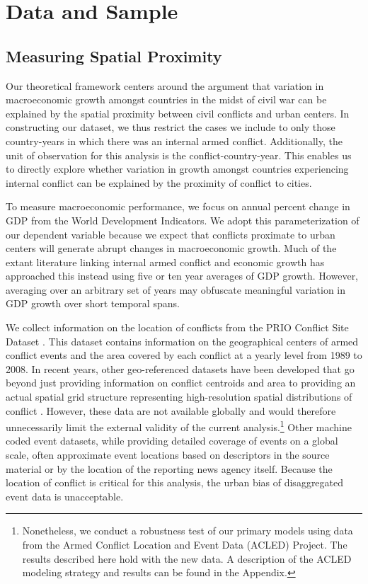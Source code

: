 
\section{Data and Sample}
\label{empirics}

\subsection{Measuring Spatial Proximity}

Our theoretical framework centers around the argument that variation in macroeconomic growth amongst countries in the midst of civil war can be explained by the spatial proximity between civil conflicts and urban centers. In constructing our dataset, we thus restrict the cases we include to only those country-years in which there was an internal armed conflict. Additionally, the unit of observation for this analysis is the conflict-country-year. This enables us to directly explore whether variation in growth amongst countries experiencing internal conflict can be explained by the proximity of conflict to cities.

To measure macroeconomic performance, we focus on annual percent change in GDP from the World Development Indicators. We adopt this parameterization of our dependent variable because we expect that conflicts proximate to urban centers will generate abrupt changes in macroeconomic growth. Much of the extant literature linking internal armed conflict and economic growth has approached this instead using five or ten year averages of GDP growth. However, averaging over an arbitrary set of years may obfuscate meaningful variation in GDP growth over short temporal spans.

We collect information on the location of conflicts from the PRIO Conflict Site Dataset \citep{hallberg:2012}. This dataset contains information on the geographical centers of armed conflict events and the area covered by each conflict at a yearly level from 1989 to 2008. In recent years, other geo-referenced datasets have been developed that go beyond just providing information on conflict centroids and area to providing an actual spatial grid structure representing high-resolution spatial distributions of conflict \citep{tollefsen:etal:2012}. However, these data are not available globally and would therefore unnecessarily limit the external validity of the current analysis.\footnote{Nonetheless, we conduct a robustness test of our primary models using data from the Armed Conflict Location and Event Data (ACLED) Project. The results described here hold with the new data. A description of the ACLED modeling strategy and results can be found in the Appendix.} Other machine coded event datasets, while providing detailed coverage of events on a global scale, often approximate event locations based on descriptors in the source material or by the location of the reporting news agency itself. Because the location of conflict is critical for this analysis, the urban bias of disaggregated event data is unacceptable.

